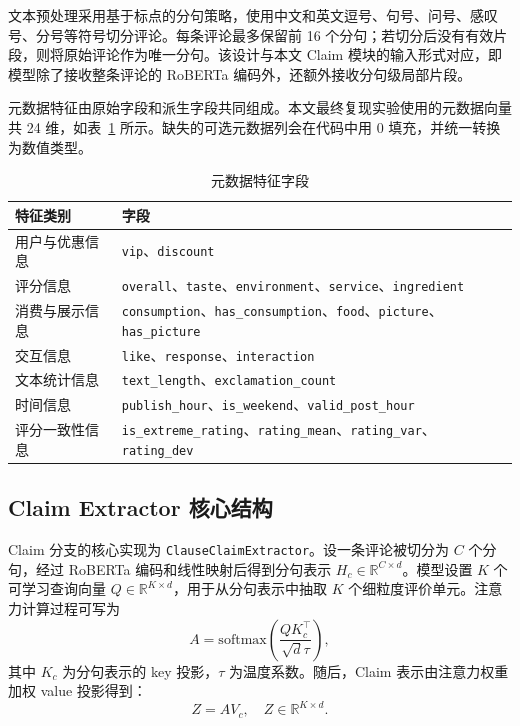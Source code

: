 \documentclass[UTF8,oneside,openright,fontset=none]{ctexbook}
\numberwithin{equation}{chapter}
\begin{document}
文本预处理采用基于标点的分句策略，使用中文和英文逗号、句号、问号、感叹号、分号等符号切分评论。每条评论最多保留前 16 个分句；若切分后没有有效片段，则将原始评论作为唯一分句。该设计与本文 Claim 模块的输入形式对应，即模型除了接收整条评论的 RoBERTa 编码外，还额外接收分句级局部片段。

元数据特征由原始字段和派生字段共同组成。本文最终复现实验使用的元数据向量共 24 维，如表~\ref{tab:appendix-meta-cols} 所示。缺失的可选元数据列会在代码中用 0 填充，并统一转换为数值类型。

\begin{table}[htbp]
  \centering
  \small
  \caption{元数据特征字段}
  \label{tab:appendix-meta-cols}
  \begin{tabularx}{\textwidth}{lX}
    \toprule
    特征类别 & 字段 \\
    \midrule
    用户与优惠信息 & \texttt{vip}、\texttt{discount} \\
    评分信息 & \texttt{overall}、\texttt{taste}、\texttt{environment}、\texttt{service}、\texttt{ingredient} \\
    消费与展示信息 & \texttt{consumption}、\texttt{has\_consumption}、\texttt{food}、\texttt{picture}、\texttt{has\_picture} \\
    交互信息 & \texttt{like}、\texttt{response}、\texttt{interaction} \\
    文本统计信息 & \texttt{text\_length}、\texttt{exclamation\_count} \\
    时间信息 & \texttt{publish\_hour}、\texttt{is\_weekend}、\texttt{valid\_post\_hour} \\
    评分一致性信息 & \texttt{is\_extreme\_rating}、\texttt{rating\_mean}、\texttt{rating\_var}、\texttt{rating\_dev} \\
    \bottomrule
  \end{tabularx}
\end{table}

\subsection{Claim Extractor 核心结构}
Claim 分支的核心实现为 \texttt{ClauseClaimExtractor}。设一条评论被切分为 $C$ 个分句，经过 RoBERTa 编码和线性映射后得到分句表示 $H_c\in\mathbb{R}^{C\times d}$。模型设置 $K$ 个可学习查询向量 $Q\in\mathbb{R}^{K\times d}$，用于从分句表示中抽取 $K$ 个细粒度评价单元。注意力计算过程可写为
\begin{equation}
  A=\mathrm{softmax}\left(\frac{QK_c^\top}{\sqrt{d}\tau}\right),
\end{equation}
其中 $K_c$ 为分句表示的 key 投影，$\tau$ 为温度系数。随后，Claim 表示由注意力权重加权 value 投影得到：
\begin{equation}
  Z=A V_c,\quad Z\in\mathbb{R}^{K\times d}.
\end{equation}
\end{document}
